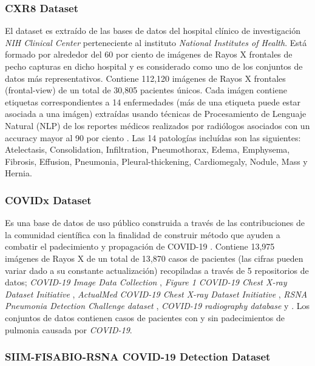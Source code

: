 \subsubsection{CXR8 Dataset}

El dataset es extraído de las bases de datos del hospital clínico de investigación \textit{NIH
Clinical Center} perteneciente al instituto \textit{National Institutes of Health}. Está formado por
alrededor del 60 por ciento de imágenes de Rayos X frontales de pecho capturas en dicho hospital y
es considerado como uno de los conjuntos de datos más representativos. Contiene
112,120 imágenes de Rayos X frontales (frontal-view) de un total de 30,805 pacientes únicos. Cada
imágen contiene etiquetas correspondientes a 14 enfermedades (más de una etiqueta puede estar
asociada a una imágen) extraídas usando técnicas de
Procesamiento de Lenguaje Natural (NLP) de los reportes médicos realizados por radiólogos asociados
con un accuracy mayor al 90 por ciento \cite{8099852}. Las 14 patologías incluídas son las
siguientes: Atelectasis, Consolidation, Infiltration, Pneumothorax, Edema, Emphysema, Fibrosis,
Effusion, Pneumonia, Pleural-thickening, Cardiomegaly, Nodule, Mass y Hernia.

\subsubsection{COVIDx  Dataset}

Es una base de datos de uso público construida a través de las contribuciones de la comunidad
científica con la finalidad de construir método que ayuden a combatir el padecimiento y propagación
de COVID-19 \cite{Wang2020}. Contiene 13,975 imágenes de Rayos X de un total de 13,870 casos de
pacientes (las cifras pueden variar dado a su constante actualización) recopiladas a través de 5
repositorios de datos; \textit{COVID-19 Image Data Collection} \cite{cohen2020covid19},
\textit{Figure 1 COVID-19 Chest X-ray Dataset Initiative} \cite{figure1_2020covid19},
\textit{ActualMed COVID-19 Chest X-ray Dataset Initiative} \cite{actualmed_2020covid19},
\textit{RSNA Pneumonia Detection Challenge dataset} \cite{rsna_det_challlenge},
\textit{COVID-19 radiography database} y \cite{rsna_det_challenge2}. Los conjuntos de datos
contienen casos de pacientes con y sin padecimientos de pulmonia causada por \textit{COVID-19}.

\subsubsection{SIIM-FISABIO-RSNA COVID-19 Detection Dataset}

